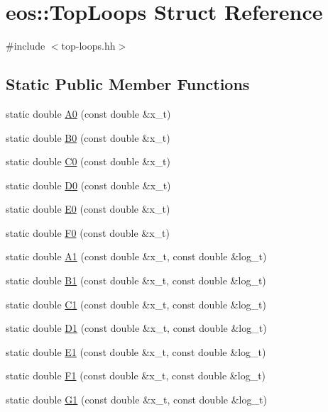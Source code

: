 \hypertarget{structeos_1_1TopLoops}{
\section{eos::TopLoops Struct Reference}
\label{structeos_1_1TopLoops}
}


{\ttfamily \#include $<$top-\/loops.hh$>$}\subsection*{Static Public Member Functions}
\begin{Indent}{\bf }\par
{\em \label{_amgrpd41d8cd98f00b204e9800998ecf8427e}
 }\begin{DoxyCompactItemize}
\item 
static double \hyperlink{structeos_1_1TopLoops_a1e5d26b35652a99a5e3e125d5814b1cf}{A0} (const double \&x\_\-t)
\item 
static double \hyperlink{structeos_1_1TopLoops_a99b769758ffe71507b5424fd98657f43}{B0} (const double \&x\_\-t)
\item 
static double \hyperlink{structeos_1_1TopLoops_ae0a4305960619de35b6485ba3ed2ff47}{C0} (const double \&x\_\-t)
\item 
static double \hyperlink{structeos_1_1TopLoops_ab2d0294c1731e85f1fa2576fdcbda692}{D0} (const double \&x\_\-t)
\item 
static double \hyperlink{structeos_1_1TopLoops_acc27faf5debf5f4b70d2690c10af4f2c}{E0} (const double \&x\_\-t)
\item 
static double \hyperlink{structeos_1_1TopLoops_a9c2ef545d78afbc1d564ec5528032b4c}{F0} (const double \&x\_\-t)
\item 
static double \hyperlink{structeos_1_1TopLoops_a08fdb46fd02c3605cdd401d8b2f7efac}{A1} (const double \&x\_\-t, const double \&log\_\-t)
\item 
static double \hyperlink{structeos_1_1TopLoops_a9f07487a5ca27483a4e7a80089137f39}{B1} (const double \&x\_\-t, const double \&log\_\-t)
\item 
static double \hyperlink{structeos_1_1TopLoops_a9ffd030324501af9b5843456a6d5ff05}{C1} (const double \&x\_\-t, const double \&log\_\-t)
\item 
static double \hyperlink{structeos_1_1TopLoops_a116720ebeb9dfa7f83c68adcc053b74f}{D1} (const double \&x\_\-t, const double \&log\_\-t)
\item 
static double \hyperlink{structeos_1_1TopLoops_a3ba9681fd4cad44013150a061e2391db}{E1} (const double \&x\_\-t, const double \&log\_\-t)
\item 
static double \hyperlink{structeos_1_1TopLoops_a11d3bd501d8533b6c864cd8f7a117386}{F1} (const double \&x\_\-t, const double \&log\_\-t)
\item 
static double \hyperlink{structeos_1_1TopLoops_a6a9e91edbf04928ccb3fa47b25de78ed}{G1} (const double \&x\_\-t, const double \&log\_\-t)
\end{DoxyCompactItemize}
\end{Indent}


